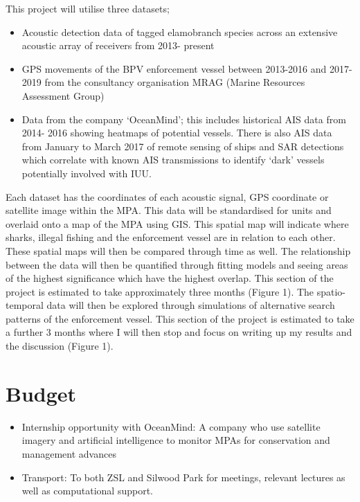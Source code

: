 \documentclass[11pt]{article}
\begin{document}
This project will utilise three datasets;
	\begin{itemize}
	\item Acoustic detection data of tagged elamobranch species across an extensive acoustic array of receivers from 2013- present 
	\item GPS movements of the BPV enforcement vessel between 2013-2016 and 2017-2019 from the consultancy organisation MRAG (Marine Resources Assessment Group)
	\item Data from the company ‘OceanMind’; this includes historical AIS data from 2014- 2016 showing heatmaps of potential vessels. There is also AIS data from January to March 2017 of remote sensing of ships and SAR detections which correlate with known AIS transmissions to identify ‘dark’ vessels potentially involved with IUU. 
	\end{itemize}

Each dataset has the coordinates of each acoustic signal, GPS coordinate or satellite image within the MPA. This data will be standardised for units and overlaid onto a map of the MPA using GIS. This spatial map will indicate where sharks, illegal fishing and the enforcement vessel are in relation to each other. These spatial maps will then be compared through time as well. The relationship between the data will then be quantified through fitting models and seeing areas of the highest significance which have the highest overlap. This section of the project is estimated to take approximately three months (Figure 1). 
The spatio-temporal data will then be explored through simulations of alternative search patterns of the enforcement vessel. This section of the project is estimated to take a further 3 months where I will then stop and focus on writing up my results and the discussion (Figure 1).



	\section{Budget}
	\noindent
		
	\begin{itemize}
		\item Internship opportunity with OceanMind: A company who use satellite imagery and artificial intelligence to monitor MPAs for conservation and management advances
		\item Transport: To both ZSL and Silwood Park for meetings, relevant lectures as well as computational support.
	\end{itemize}
	
	
	\newpage
	  

	\vspace*{1\baselineskip}
	\printbibliography 
\end{document}
